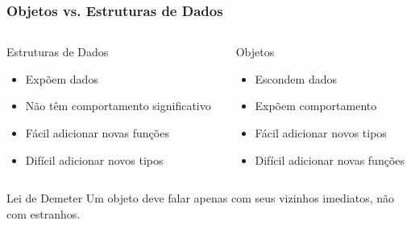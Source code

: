 \documentclass[aspectratio=169]{beamer}
\begin{document}
\begin{frame}
\frametitle{Objetos vs. Estruturas de Dados}

\begin{columns}
\begin{column}{0.5\textwidth}
\begin{block}{Estruturas de Dados}
\begin{itemize}
    \item Expõem dados
    \item Não têm comportamento significativo
    \item Fácil adicionar novas funções
    \item Difícil adicionar novos tipos
\end{itemize}
\end{block}

\begin{center}
\end{center}
\end{column}

\begin{column}{0.5\textwidth}
\begin{block}{Objetos}
\begin{itemize}
    \item Escondem dados
    \item Expõem comportamento
    \item Fácil adicionar novos tipos
    \item Difícil adicionar novas funções
\end{itemize}
\end{block}

\begin{center}
\end{center}
\end{column}
\end{columns}

\vspace{0.5cm}
\begin{alertblock}{Lei de Demeter}
Um objeto deve falar apenas com seus vizinhos imediatos, não com estranhos.
\end{alertblock}
\end{frame}
\end{document}
